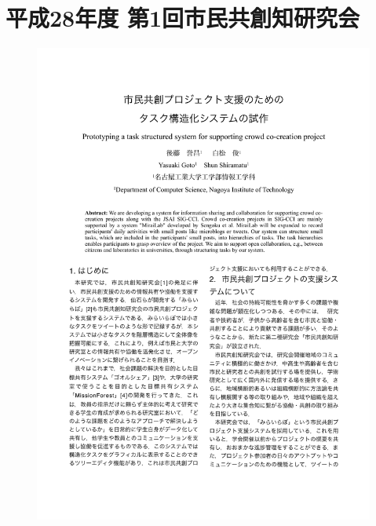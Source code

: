 \chapter{平成28年度 第1回市民共創知研究会}
\begin{figure}[ht]
    \begin{center}
        \includegraphics[width=1.0\linewidth]{assets/pdf/sig_cci2016_1.pdf}
    \end{center}
\end{figure}
